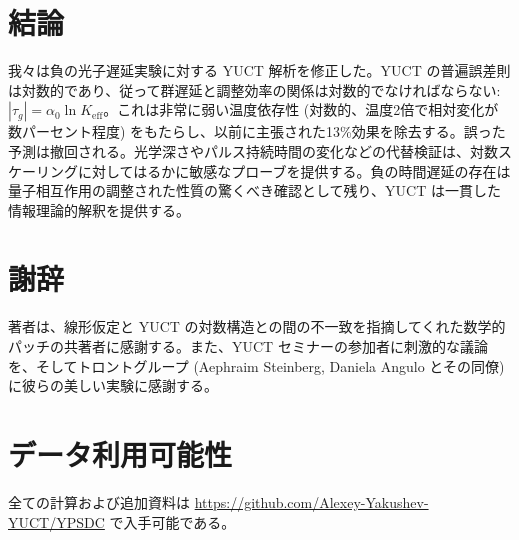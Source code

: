 \documentclass[12pt,a4paper]{article}
\newcommand{\Keff}{K_{\mathrm{eff}}}
\begin{document}
	\section{結論}
	
	我々は負の光子遅延実験に対する YUCT 解析を修正した。YUCT の普遍誤差則は対数的であり、従って群遅延と調整効率の関係は対数的でなければならない: \(|\tau_g| = \alpha_0 \ln\Keff\)。これは非常に弱い温度依存性 (対数的、温度2倍で相対変化が数パーセント程度) をもたらし、以前に主張された13\%効果を除去する。誤った予測は撤回される。光学深さやパルス持続時間の変化などの代替検証は、対数スケーリングに対してはるかに敏感なプローブを提供する。負の時間遅延の存在は量子相互作用の調整された性質の驚くべき確認として残り、YUCT は一貫した情報理論的解釈を提供する。
	
	\section*{謝辞}
	
	著者は、線形仮定と YUCT の対数構造との間の不一致を指摘してくれた数学的パッチの共著者に感謝する。また、YUCT セミナーの参加者に刺激的な議論を、そしてトロントグループ (Aephraim Steinberg, Daniela Angulo とその同僚) に彼らの美しい実験に感謝する。
	
	\section*{データ利用可能性}
	
	全ての計算および追加資料は \url{https://github.com/Alexey-Yakushev-YUCT/YPSDC} で入手可能である。
	
\end{document}
